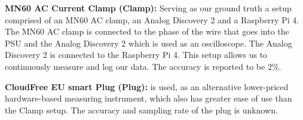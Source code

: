 \noindent\textbf{MN60 AC Current Clamp (Clamp):}
Serving as our ground truth a setup comprised of an MN60 AC clamp, an Analog Discovery 2 and a Raspberry Pi 4. The MN60 AC clamp is connected to the phase of the wire that goes into the PSU and the Analog Discovery 2 which is used as an oscilloscope. The Analog Discovery 2 is connected to the Raspberry Pi 4. This setup allows us to continuously measure and log our data.\cite{biksbois} The accuracy is reported to be $2\%$\cite{ClampDoc}.\newline

\noindent\textbf{CloudFree EU smart Plug (Plug):} is used, as an alternative lower-priced hardware-based measuring instrument, which also has greater ease of use than the Clamp setup. The accuracy and sampling rate of the plug is unknown.\cite{CloudFreeEUSMartPlug}\newline
